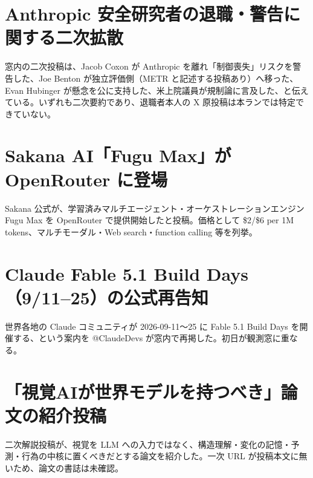 \section{Anthropic 安全研究者の退職・警告に関する二次拡散}
窓内の二次投稿は、Jacob Coxon が Anthropic を離れ「制御喪失」リスクを警告した、Joe Benton が独立評価側（METR と記述する投稿あり）へ移った、Evan Hubinger が懸念を公に支持した、米上院議員が規制論に言及した、と伝えている。いずれも二次要約であり、退職者本人の X 原投稿は本ランでは特定できていない。

\section{Sakana AI「Fugu Max」が OpenRouter に登場}
Sakana 公式が、学習済みマルチエージェント・オーケストレーションエンジン Fugu Max を OpenRouter で提供開始したと投稿。価格として \$2/\$6 per 1M tokens、マルチモーダル・Web search・function calling 等を列挙。

\section{Claude Fable 5.1 Build Days（9/11--25）の公式再告知}
世界各地の Claude コミュニティが 2026-09-11〜25 に Fable 5.1 Build Days を開催する、という案内を @ClaudeDevs が窓内で再掲した。初日が観測窓に重なる。

\section{「視覚AIが世界モデルを持つべき」論文の紹介投稿}
二次解説投稿が、視覚を LLM への入力ではなく、構造理解・変化の記憶・予測・行為の中核に置くべきだとする論文を紹介した。一次 URL が投稿本文に無いため、論文の書誌は未確認。

